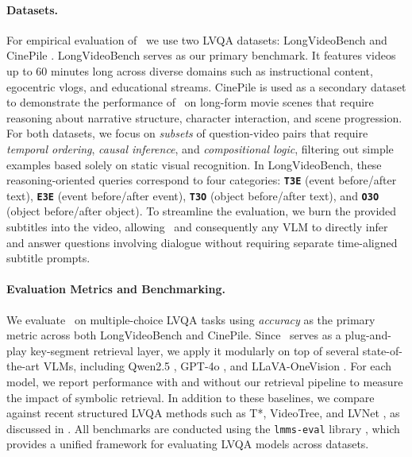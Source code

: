 \documentclass[letterpaper]{article} %
\begin{document}
    \paragraph{Datasets.}
    For empirical evaluation of \nsvqa\, we use two LVQA datasets: LongVideoBench \citep{wu2024longvideobench} and CinePile \citep{rawal2024cinepile}. 
    LongVideoBench serves as our primary benchmark. It features videos up to 60 minutes long across diverse domains such as instructional content, egocentric vlogs, and educational streams. CinePile is used as a secondary dataset to demonstrate the performance of \nsvqa\ on long-form movie scenes that require reasoning about narrative structure, character interaction, and scene progression. For both datasets, we focus on \textit{subsets} of question-video pairs that require \textit{temporal ordering}, \textit{causal inference}, and \textit{compositional logic}, filtering out simple examples based solely on static visual recognition. In LongVideoBench, these reasoning-oriented queries correspond to four categories: \textbf{\texttt{T3E}} (event before/after text), \textbf{\texttt{E3E}} (event before/after event), \textbf{\texttt{T3O}} (object before/after text), and \textbf{\texttt{O3O}} (object before/after object). To streamline the evaluation, we burn the provided subtitles into the video, allowing \nsvqa\ and consequently any VLM to directly infer and answer questions involving dialogue without requiring separate time-aligned subtitle prompts. 

    \paragraph{Evaluation Metrics and Benchmarking.}
    We evaluate \nsvqa\ on multiple-choice LVQA tasks using \textit{accuracy} as the primary metric across both LongVideoBench and CinePile. Since \nsvqa\ serves as a plug-and-play key-segment retrieval layer, we apply it modularly on top of several state-of-the-art VLMs, including Qwen2.5 \citep{bai2025qwen2}, GPT-4o \citep{achiam2023gpt}, and LLaVA-OneVision \citep{li2024llava}. For each model, we report performance with and without our retrieval pipeline to measure the impact of symbolic retrieval.
    In addition to these baselines, we compare against recent structured LVQA methods such as T*, VideoTree, and LVNet \citep{ye2025re, wang2025videotree, park2024too}, as discussed in . All benchmarks are conducted using the \texttt{lmms-eval} library \citep{zhang2024lmms}, which provides a unified framework for evaluating LVQA models across datasets. 
\end{document}
